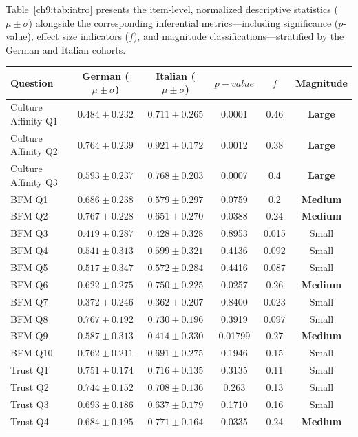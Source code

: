 Table~\ref{ch9:tab:intro} presents the item-level, normalized descriptive statistics ($\mu \pm \sigma$) alongside the corresponding inferential metrics—including significance ($p$-value), effect size indicators ($f$), and magnitude classifications—stratified by the German and Italian cohorts.
\begin{table}[ht]
\centering
\begin{tabular}{lccccc}
\toprule
Question & German ($\mu \pm \sigma$) & Italian ($\mu \pm \sigma$) & $p-value$ & $f$ & Magnitude \\
\midrule
Culture Affinity Q1 & $0.484 \pm 0.232$ & $0.711 \pm 0.265$ & 0.0001 & 0.46 & \textbf{Large} \\
Culture Affinity Q2 & $0.764 \pm 0.239$ & $0.921 \pm 0.172$ & 0.0012 & 0.38 & \textbf{Large} \\
Culture Affinity Q3 & $0.593 \pm 0.237$ & $0.768 \pm 0.203$ & 0.0007 & 0.4 & \textbf{Large} \\
BFM Q1 & $0.686 \pm 0.238$ & $0.579 \pm 0.297$ & 0.0759 & 0.2 & \textbf{Medium} \\
BFM Q2 & $0.767 \pm 0.228$ & $0.651 \pm 0.270$ & 0.0388 & 0.24 & \textbf{Medium} \\
BFM Q3 & $0.419 \pm 0.287$ & $0.428 \pm 0.328$ & 0.8953 & 0.015 & Small \\
BFM Q4 & $0.541 \pm 0.313$ & $0.599 \pm 0.321$ & 0.4136 & 0.092 & Small \\
BFM Q5 & $0.517 \pm 0.347$ & $0.572 \pm 0.284$ & 0.4416 & 0.087 & Small \\
BFM Q6 & $0.622 \pm 0.275$ & $0.750 \pm 0.225$ & 0.0257 & 0.26 & \textbf{Medium} \\
BFM Q7 & $0.372 \pm 0.246$ & $0.362 \pm 0.207$ & 0.8400 & 0.023 & Small \\
BFM Q8 & $0.767 \pm 0.192$ & $0.730 \pm 0.196$ & 0.3919 & 0.097 & Small \\
BFM Q9 & $0.587 \pm 0.313$ & $0.414 \pm 0.330$ & 0.01799 & 0.27 & \textbf{Medium} \\
BFM Q10 & $0.762 \pm 0.211$ & $0.691 \pm 0.275$ & 0.1946 & 0.15 & Small \\
Trust Q1 & $0.751 \pm 0.174$ & $0.716 \pm 0.135$ & 0.3135 & 0.11 & Small \\
Trust Q2 & $0.744 \pm 0.152$ & $0.708 \pm 0.136$ & 0.263 & 0.13 & Small \\
Trust Q3 & $0.693 \pm 0.186$ & $0.637 \pm 0.179$ & 0.1710 & 0.16 & Small \\
Trust Q4 & $0.684 \pm 0.195$ & $0.771 \pm 0.164$ & 0.0335 & 0.24 & \textbf{Medium} \\

\end{tabular}
\end{table}
